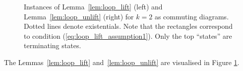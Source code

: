 \begin{figure}
  \center
  \hspace{1cm}
  \caption{Instances of Lemma~\ref{lem:loop_lift} (left) and Lemma~\ref{lem:loop_unlift} (right) for $k=2$ as commuting diagrams.  Dotted lines denote
    existentials.  Note that the rectangles correspond to condition (\ref{eq:loop_lift_assumption1}).  Only the top ``states'' are terminating
    states.}
  \label{fig:loop_lift_lemmas}
\end{figure}

The Lemmas~\ref{lem:loop_lift} and~\ref{lem:loop_unlift} are visualised in Figure \ref{fig:loop_lift_lemmas}.

